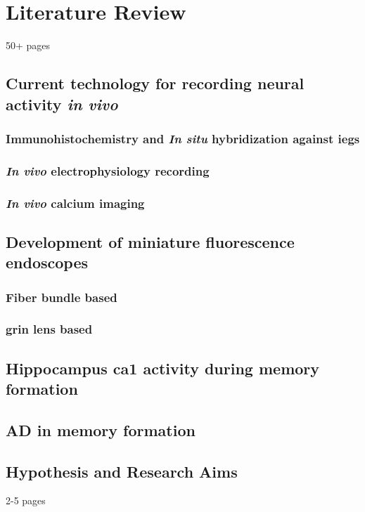 \chapter{Literature Review}
50+ pages

\section{Current technology for recording neural activity \textit{in vivo}}
\subsection{Immunohistochemistry and \textit{In situ} hybridization against \glspl{ieg}}
\subsection{\textit{In vivo} electrophysiology recording}
\subsection{\textit{In vivo} calcium imaging}

\section{Development of miniature fluorescence endoscopes}
\subsection{Fiber bundle based}
\subsection{\gls{grin} lens based}

\section{Hippocampus \gls{ca1} activity during memory formation}

\section{\gls{AD} in memory formation}

\section{Hypothesis and Research Aims}
2-5 pages
